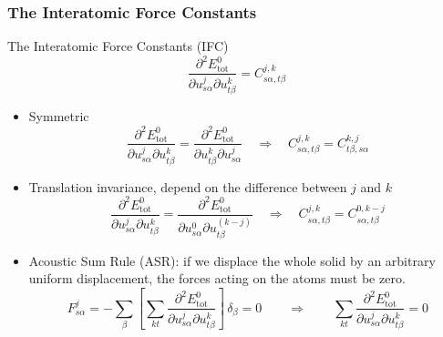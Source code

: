 \begin{frame}
  \frametitle{The Interatomic Force Constants}
  The Interatomic Force Constants (IFC)
  \begin{equation*}
    \frac{
      \partial^2 E^0_{\text{tot}}
    }{
      \partial {u}_{s\alpha}^j
      \partial {u}_{t\beta}^k
    }
    =
    C_{s\alpha, t\beta}^{j, k}
  \end{equation*}

  \begin{itemize}
  \item Symmetric
    \begin{equation}
      \label{eq:ifc_sym_prop}
        \frac{
        \partial^2 E^0_{\text{tot}}
        }{
        \partial {u}_{s\alpha}^j
        \partial {u}_{t\beta}^k
        }
        =
        \frac{
        \partial^2 E^0_{\text{tot}}
        }{
        \partial {u}_{t\beta}^k
        \partial {u}_{s\alpha}^j
        }
        \quad \Rightarrow \quad
        C_{s\alpha, t\beta}^{j, k}
        =
        C_{t\beta, s\alpha}^{k, j}
    \end{equation}
  \item Translation invariance, depend on the difference between $j$ and $k$
    \begin{equation}
      \label{eq:ifc_ti_prop}
        \frac{
        \partial^2 E^0_{\text{tot}}
        }{
        \partial {u}_{s\alpha}^j
        \partial {u}_{t\beta}^k
        }
        =
        \frac{
        \partial^2 E^0_{\text{tot}}
        }{
        \partial {u}_{s\alpha}^0
        \partial {u}_{t\beta}^{(k-j)}
        }
        \quad \Rightarrow \quad
        C_{s\alpha, t\beta}^{j, k}
        =
        C_{s\alpha, t\beta}^{0, k-j}
    \end{equation}
  \item Acoustic Sum Rule (ASR): if we displace the whole solid by an arbitrary uniform
    displacement, the forces acting on the atoms must be zero.
    \begin{equation}
      \label{eq:ifc_asr_prop}
      F_{s\alpha}^j =
      - \sum_{\beta}
      \left[
        \sum_{kt}
        \frac{
        \partial^2 E^0_{\text{tot}}
        }{
        \partial {u}_{s\alpha}^j
        \partial {u}_{t\beta}^k
        }
      \right]
      \,
      \delta_\beta
      = 0
      \qquad\Rightarrow\qquad
      \sum_{kt}
        \frac{
        \partial^2 E^0_{\text{tot}}
        }{
        \partial {u}_{s\alpha}^j
        \partial {u}_{t\beta}^k
        } = 0
      \end{equation}
  \end{itemize}
\end{frame}